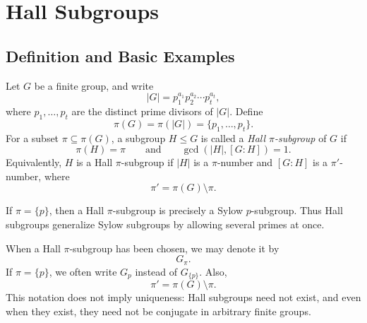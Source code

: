 \chapter{Hall Subgroups}

\providecommand{\Sym}{\operatorname{Sym}}
\providecommand{\PSL}{\operatorname{PSL}}
\providecommand{\Syl}{\operatorname{Syl}}
\providecommand{\Hall}{\operatorname{Hall}}
\providecommand{\Dih}{\operatorname{Dih}}
\providecommand{\Op}[2]{\mathrm{O}_{#1}(#2)}
\providecommand{\CG}[2]{\mathrm{C}_{#1}(#2)}
\renewcommand{\NG}[2]{\mathrm{N}_{#1}(#2)}

\section{Definition and Basic Examples}

\begin{definition}
Let \(G\) be a finite group, and write
\[
    |G|=p_1^{a_1}p_2^{a_2}\cdots p_t^{a_t},
\]
where \(p_1,\ldots,p_t\) are the distinct prime divisors of \(|G|\). Define
\[
    \pi(G)=\pi(|G|)=\{p_1,\ldots,p_t\}.
\]
For a subset \(\pi\subseteq \pi(G)\), a subgroup \(H\leq G\) is called a
\emph{Hall \(\pi\)-subgroup} of \(G\) if
\[
    \pi(H)=\pi
    \qquad\text{and}\qquad
    \gcd(|H|,[G:H])=1.
\]
Equivalently, \(H\) is a Hall \(\pi\)-subgroup if \(|H|\) is a \(\pi\)-number and
\([G:H]\) is a \(\pi'\)-number, where
\[
    \pi'=\pi(G)\setminus \pi.
\]
\end{definition}

\begin{remark}
If \(\pi=\{p\}\), then a Hall \(\pi\)-subgroup is precisely a Sylow
\(p\)-subgroup. Thus Hall subgroups generalize Sylow subgroups by allowing
several primes at once.
\end{remark}

\begin{topic}[Notation]
When a Hall \(\pi\)-subgroup has been chosen, we may denote it by
\[
    G_{\pi}.
\]
If \(\pi=\{p\}\), we often write \(G_p\) instead of \(G_{\{p\}}\). Also,
\[
    \pi'=\pi(G)\setminus \pi.
\]
This notation does not imply uniqueness: Hall subgroups need not exist, and even
when they exist, they need not be conjugate in arbitrary finite groups.
\end{topic}

